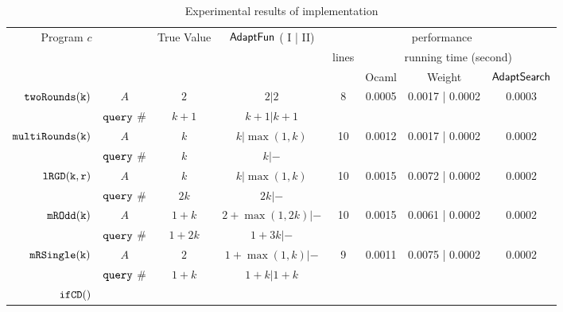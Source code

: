 
\begin {table}[H]
\vspace{-0.5cm}
    \caption{Experimental results of {\THESYSTEM} implementation}
    \vspace{-0.5cm}
        \label{tb:adapt-imp}
        \begin{center}
        \centering
{\scriptsize
        \begin{tabular}{ r | c | c | c | c | c | c | c  }
        \multirow{3}{*}{Program $c$} & 
        \multirow{3}{*}{}
         & True Value
         & {$\textsf{AdaptFun}$ ( I | II)}
         & \multicolumn{4}{c}{performance} \\ 
         \cline{5-8}
         & & \multirow{2}{*}{ } & \multirow{2}{*}{} & \multirow{2}{*}{lines} & \multicolumn{3}{c}{running time (second)} \\ 
         \cline{6-8}
         & & & &  & Ocaml & Weight & $\mathsf{AdaptSearch}$  \\
         \hline \hline
         \multirow{2}{*}{$\mathtt{twoRounds(k)}$}  
         & $A$ &  $2$ & $2| 2$  & \multirow{2}{*}{8} & \multirow{2}{*}{0.0005} & \multirow{2}{*}{0.0017 | 0.0002} & \multirow{2}{*}{0.0003} \\
         \cline{2-4}
         & ${\tt query}$ \#   &  $k + 1$ & $k+1 | k+1$  & & & & \\
         \hline
         \multirow{2}{*}{$\mathtt{multiRounds(k)}$} 
         & $A$  &  $k$          & $k| \max(1,k)$  &  10 & 0.0012 & 0.0017 | 0.0002 & 0.0002 \\
         \cline{2-4}
         & ${\tt query}$ \#   & $k $ & $k | -$  & & & & \\
         \hline
         \multirow{2}{*}{$\mathtt{lRGD(k, r)}$}
         & $A$ & $k$ & $k | \max(1,k) $   &  10 & 0.0015 & 0.0072 | 0.0002 & 0.0002  \\
         \cline{2-4}
         & ${\tt query}$ \#   & $2k $ & $2k | -$  & & & & \\
         \hline
         $  \mathtt{mROdd(k)}$ 
         & $A$  &  $1 + k$ &  $2+\max(1,2k) | - $ &  10 & 0.0015 & 0.0061 | 0.0002 & 0.0002 \\
         \cline{2-4}
         & ${\tt query}$ \#   & $1+2k $ & $1 + 3k | - $  & & & & \\
         \hline
         $  \mathtt{mRSingle(k)}$  
         & $A$ & $2$ &  $1+ \max(1, k) | -$   &  9 & 0.0011 & 0.0075 | 0.0002 & 0.0002 \\
         \cline{2-4}
         & ${\tt query}$ \#   & $1 + k$ & $1 + k | 1 + k$ & & & & \\
         \hline
         $  \mathtt{ifCD()}$ 

\end{tabular}}
\end{center}
\end{table}
